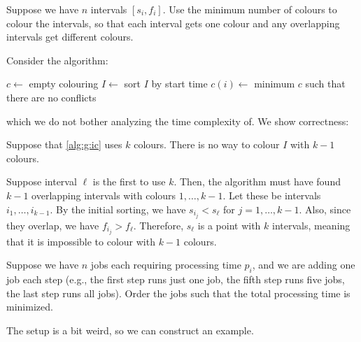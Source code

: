 \begin{problem}
  Suppose we have $n$ intervals $[s_i, f_i]$.
  Use the minimum number of colours to colour the intervals,
  so that each interval gets one colour
  and any overlapping intervals get different colours.
\end{problem}

Consider the algorithm:

\begin{algorithm}[H]
  \caption{\label{alg:g:ic}}
  \begin{algorithmic}[1]
    \State $c \gets$ empty colouring
    \State $I \gets$ sort $I$ by start time
      \State $c(i) \gets$ minimum $c$ such that there are no conflicts
    \EndFor
  \end{algorithmic}
\end{algorithm}

which we do not bother analyzing the time complexity of.
We show correctness:

\begin{prop}
  Suppose that \cref{alg:g:ic} uses $k$ colours.
  There is no way to colour $I$ with $k-1$ colours.
\end{prop}
\begin{prf}
  Suppose interval $\ell$ is the first to use $k$.
  Then, the algorithm must have found $k-1$ overlapping intervals with colours $1,\dotsc,k-1$.
  Let these be intervals $i_1,\dotsc,i_{k-1}$.
  By the initial sorting, we have $s_{i_j} < s_\ell$ for $j = 1,\dotsc,k-1$.
  Also, since they overlap, we have $f_{i_j} > f_\ell$.
  Therefore, $s_\ell$ is a point with $k$ intervals,
  meaning that it is impossible to colour with $k-1$ colours.
\end{prf}

\begin{problem}
  Suppose we have $n$ jobs each requiring processing time $p_i$,
  and we are adding one job each step (e.g., the first step runs just one job,
  the fifth step runs five jobs, the last step runs all jobs).
  Order the jobs such that the total processing time is minimized.
\end{problem}

The setup is a bit weird, so we can construct an example.

